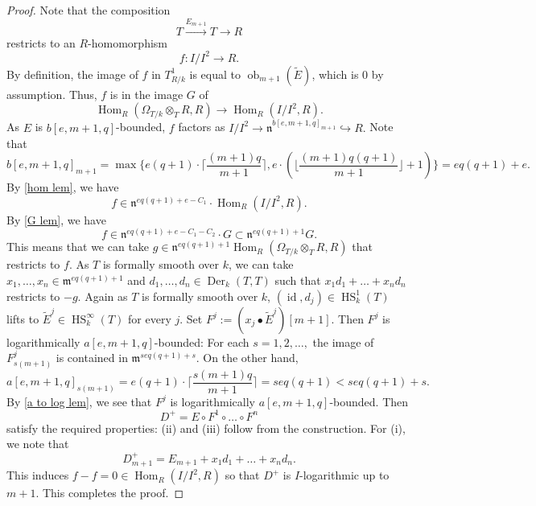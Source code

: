 \documentclass{amsart}
\newcommand{\Hom}{\operatorname{Hom}}
\newcommand{\HS}{\operatorname{HS}}
\begin{document}
\begin{proof}
     Note that the composition
    $$T\overset{E_{m+1}}{\longrightarrow} T\to R$$
    restricts to an $R$-homomorphism
    $$f: I/I^2\to R.$$
    By definition, the image of $f$ in $T^1_{R/k}$ is equal to $\operatorname{ob}_{m+1}(\widetilde{E})$, which is $0$ by assumption. Thus, $f$ is in the image $G$ of
    $$\Hom_R(\Omega_{T/k}\otimes_T R,R)\to \Hom_R (I/I^2,R).$$
    As $E$ is $b[e,m+1,q]$-bounded, $f$ factors as $I/I^2\to \mathfrak{n}^{b[e,m+1,q]_{m+1}}\hookrightarrow R.$ Note that 
    $$ b[e,m+1,q]_{m+1} =\max\{e(q+1)\cdot \lceil \frac{(m+1)q}{m+1} \rceil,  e\cdot (\lfloor \frac{(m+1)q(q+1)}{m+1} \rfloor+1) \}=eq(q+1)+e.$$
    By \ref{hom lem}, we have
    $$f\in \mathfrak{n}^{eq(q+1)+e - C_1}\cdot \Hom_R (I/I^2,R).$$
    By \ref{G lem}, we have
    $$f\in \mathfrak{n}^{eq(q+1)+e - C_1-C_2}\cdot G\subset \mathfrak{n}^{eq(q+1)+1}G.$$
    This means that we can take $g\in \mathfrak{n}^{eq(q+1)+1}\Hom_R(\Omega_{T/k}\otimes_T R,R) $ that restricts to $f$. As $T$ is formally smooth over $k$, we can take $x_1,\dots,x_n\in \mathfrak{m}^{eq(q+1)+1}$ and $d_1,\dots,d_n\in \operatorname{Der}_k(T,T)$ such that
    $x_1d_1+\dots +x_nd_n$
    restricts to $-g$. Again as $T$ is formally smooth over $k$, $(\operatorname{id}, d_j)\in \HS_k^1(T)$ lifts to $\widetilde{E}^j\in \HS_k^\infty (T)$ for every $j$. Set $F^j:=(x_j\bullet \widetilde{E}^j)[m+1]$. Then $F^j$ is logarithmically $a[e,m+1,q]$-bounded: For each $s=1,2,\dots,$ the image of $F^j_{s(m+1)}$ is contained in $\mathfrak{m}^{seq(q+1)+s}$. On the other hand,
    $$a[e,m+1,q]_{s(m+1)}=e(q+1)\cdot \lceil \frac{s(m+1)q}{m+1} \rceil=seq(q+1)< seq(q+1)+s.$$
    By \ref{a to log lem}, we see that $F^j$ is logarithmically $a[e,m+1,q]$-bounded. Then
    $$D^+=E\circ F^1\circ \dots \circ F^n$$
    satisfy the required properties: (ii) and (iii) follow from the construction. For (i), we note that
    $$D^+_{m+1}=E_{m+1}+x_1d_1+\dots+x_nd_n.$$
    This induces $f-f=0\in \operatorname{Hom}_R(I/I^2,R)$ so that $D^+$ is $I$-logarithmic up to $m+1$.
    This completes the proof.
    \end{proof}
\end{document}
